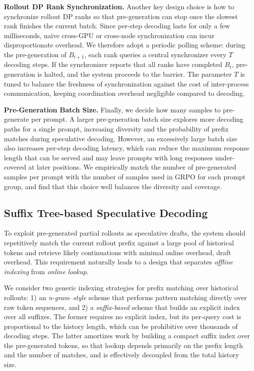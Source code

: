 \textbf{Rollout DP Rank Synchronization.}
Another key design choice is how to synchronize rollout DP ranks so that pre-generation can stop once the slowest rank finishes the current batch. Since per-step decoding lasts for only a few milliseconds, naive cross-GPU or cross-node synchronization can incur disproportionate overhead. 
We therefore adopt a periodic polling scheme: during the pre-generation of \(B_{t+1}\), each rank queries a central synchronizer every \(T\) decoding steps. If the synchronizer reports that all ranks have completed \(B_t\), pre-generation is halted, and the system proceeds to the barrier. 
The parameter \(T\) is tuned to balance the freshness of synchronization against the cost of inter-process communication, keeping coordination overhead negligible compared to decoding.

\textbf{Pre-Generation Batch Size.}
Finally, we decide how many samples to pre-generate per prompt. A larger pre-generation batch size explores more decoding paths for a single prompt, increasing diversity and the probability of prefix matches during speculative decoding. However, an excessively large batch size also increases per-step decoding latency, which can reduce the maximum response length that can be served and may leave prompts with long responses under-covered at later positions. 
We empirically match the number of pre-generated samples per prompt with the number of samples used in GRPO for each prompt group, and find that this choice well balances the diversity and coverage.


\subsection{Suffix Tree-based Speculative Decoding}
\label{sec:3_2}
To exploit pre-generated partial rollouts as speculative drafts, the system should repetitively match the current rollout prefix against a large pool of historical tokens and retrieve likely continuations with minimal online overhead, \ie draft overhead. 
This requirement naturally leads to a design that separates \textit{offline indexing} from \textit{online lookup}.

We consider two generic indexing strategies for prefix matching over historical rollouts: 1) an \emph{n-gram–style} scheme that performs pattern matching directly over raw token sequences, and 2) a \emph{suffix-based} scheme that builds an explicit index over all suffixes. 
The former requires no explicit index, but its per-query cost is proportional to the history length, which can be prohibitive over thousands of decoding steps. 
The latter amortizes work by building a compact suffix index over the pre-generated tokens, so that lookup depends primarily on the prefix length and the number of matches, and is effectively decoupled from the total history size.

